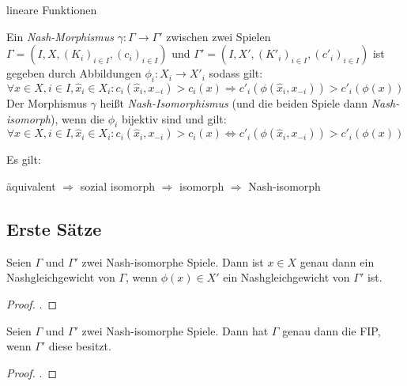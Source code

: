 \begin{bsp}
	lineare Funktionen
\end{bsp}	

\begin{defn}\label{def:NashMorphismus}
	Ein \emph{Nash-Morphismus} $\gamma: \Gamma \to \Gamma'$ zwischen zwei Spielen $\Gamma = (I, X, (K_i)_{i\in I}, (c_i)_{i\in I})$ und $\Gamma' = (I, X', (K'_i)_{i\in I}, (c'_i)_{i\in I})$ ist gegeben durch Abbildungen $\phi_i: X_i \to X'_i$ sodass gilt:
		\[\forall x\in X, i \in I, \hat{x}_i \in X_i: c_i(\hat{x}_i,x_{-i}) > c_i(x) \Rightarrow c'_i(\phi(\hat{x}_i,x_{-i})) > c'_i(\phi(x))\]
	Der Morphismus $\gamma$ heißt \emph{Nash-Isomorphismus} (und die beiden Spiele dann \emph{Nash-isomorph}), wenn die $\phi_i$ bijektiv sind und gilt:
		\[\forall x\in X, i \in I, \hat{x}_i \in X_i: c_i(\hat{x}_i,x_{-i}) > c_i(x) \iff c'_i(\phi(\hat{x}_i,x_{-i})) > c'_i(\phi(x))\]
\end{defn}

\begin{beob}
	Es gilt:
	\begin{center}
		äquivalent $\Rightarrow$ sozial isomorph $\Rightarrow$ isomorph $\Rightarrow$ Nash-isomorph
	\end{center}
\end{beob}


\subsection{Erste Sätze}

\begin{lemma}
	Seien $\Gamma$ und $\Gamma'$ zwei Nash-isomorphe Spiele. Dann ist $x \in X$ genau dann ein Nashgleichgewicht von $\Gamma$, wenn $\phi(x) \in X'$ ein Nashgleichgewicht von $\Gamma'$ ist.
\end{lemma}

\begin{proof}.
	
\end{proof}

\begin{lemma}
	Seien $\Gamma$ und $\Gamma'$ zwei Nash-isomorphe Spiele. Dann hat $\Gamma$ genau dann die FIP, wenn $\Gamma'$ diese besitzt.
\end{lemma}

\begin{proof}.
	
\end{proof}


